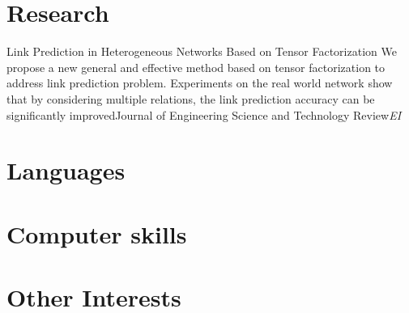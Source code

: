 \documentclass[11pt,a4paper]{moderncv}
\begin{document}
\section{Research}
{Link Prediction in Heterogeneous Networks Based on Tensor Factorization}
{We propose a new general and effective method based on tensor factorization to address link prediction problem.
Experiments on the real world network show that by considering multiple relations, the link prediction accuracy can be significantly improved}{Journal of Engineering Science and Technology Review}{\emph{EI}}{}

\section{Languages}

\section{Computer skills}

\section{Other Interests}


\closesection{}
\end{document}
